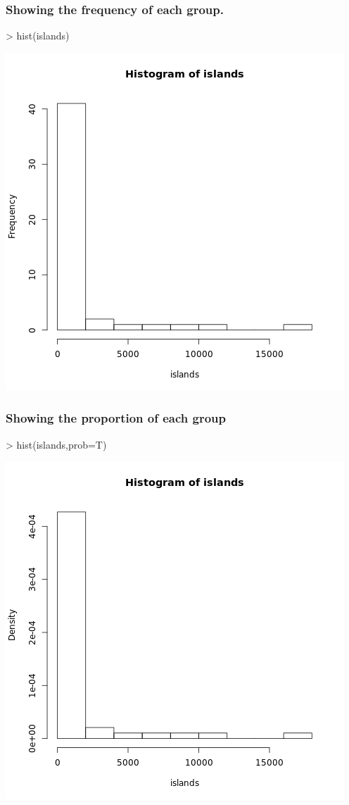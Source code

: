 \documentclass[a4paper,11pt]{article}
\begin{document}
\subsubsection{Showing the frequency of each group.}
\begin{rcode}
> hist(islands)
\end{rcode}
\includegraphics{hist}
\subsubsection{Showing the proportion of each group}
\begin{rcode}
> hist(islands,prob=T)
\end{rcode}
\includegraphics{hist-2}
\end{document}
